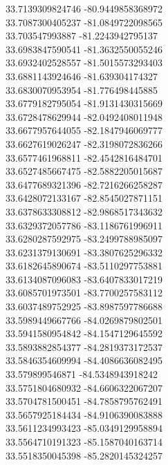 {33.7139309824746	-80.9449858368972\\
33.7087300405237	-81.0849722098565\\
33.703547993887	-81.2243942795137\\
33.6983847590541	-81.3632550055246\\
33.6932402528557	-81.5015573293403\\
33.6881143924646	-81.639304174327\\
33.6830070953954	-81.776498445885\\
33.6779182795054	-81.9131430315669\\
33.6728478629944	-82.0492408011948\\
33.6677957644055	-82.1847946069777\\
33.6627619026247	-82.3198072836266\\
33.6577461968811	-82.4542816484701\\
33.6527485667475	-82.5882205015687\\
33.6477689321396	-82.7216266258287\\
33.6428072133167	-82.8545027871151\\
33.6378633308812	-82.9868517343632\\
33.6329372057786	-83.1186761996911\\
33.6280287592975	-83.2499788985097\\
33.6231379130691	-83.3807625296332\\
33.6182645890674	-83.5110297753881\\
33.6134087096083	-83.6407833017219\\
33.6085701973501	-83.7700257583112\\
33.6037489752925	-83.8987597786688\\
33.5989449667766	-84.0269879802501\\
33.5941580954842	-84.1547129645592\\
33.5893882854377	-84.2819373172537\\
33.5846354609994	-84.4086636082495\\
33.579899546871	-84.5348943918242\\
33.5751804680932	-84.6606322067207\\
33.5704781500451	-84.7858795762491\\
33.5657925184434	-84.9106390083888\\
33.5611234993423	-85.0349129958894\\
33.5564710191323	-85.1587040163714\\
33.5518350045398	-85.2820145324257\\
}

